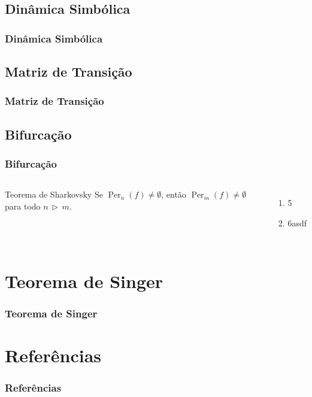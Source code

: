\documentclass{beamer}
\DeclareMathOperator{\per}{Per}
\begin{document}
\subsection{Dinâmica Simbólica}
\begin{frame}[t]
\frametitle{Dinâmica Simbólica}
\end{frame}

\subsection{Matriz de Transição}
\begin{frame}[t]
\frametitle{Matriz de Transição}
\end{frame}

\subsection{Bifurcação}
\begin{frame}[t]
\frametitle{Bifurcação}

\begin{columns}
  \column{\dimexpr\paperwidth-5pt}
  \begin{block}{Teorema de Sharkovsky}
Se $\per_n(f) \neq \emptyset$, então $\per_m(f) \neq \emptyset$ para todo $n \, \triangleright \, m$.
  
  \end{block}
  
  \begin{enumerate}
  \item 5
  \item 6asdf
  \end{enumerate}
\end{columns}

\end{frame}



\section{Teorema de Singer}
\begin{frame}[t]
\frametitle{Teorema de Singer}
\cite{burns}
\cite{devaney}
\cite{holmgren}
\end{frame}

\section*{Referências}
\begin{frame}[t]
\frametitle{Referências}
\nocite{burns, devaney, holmgren}


\end{frame}
\end{document}
